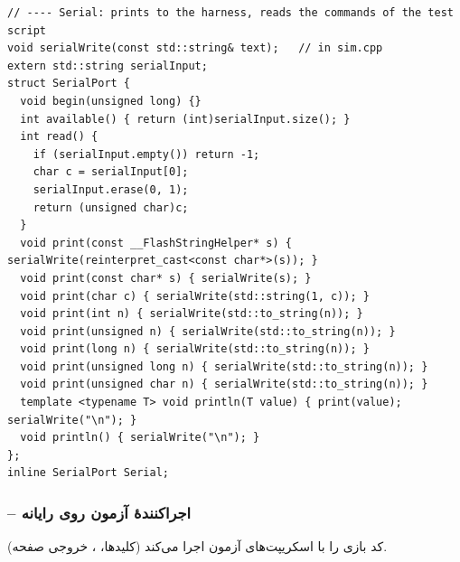 \documentclass[11pt,a4paper]{article}
\begin{document}
\begin{latin}
\begin{lstlisting}[language=Arduino]
// ---- Serial: prints to the harness, reads the commands of the test script
void serialWrite(const std::string& text);   // in sim.cpp
extern std::string serialInput;
struct SerialPort {
  void begin(unsigned long) {}
  int available() { return (int)serialInput.size(); }
  int read() {
    if (serialInput.empty()) return -1;
    char c = serialInput[0];
    serialInput.erase(0, 1);
    return (unsigned char)c;
  }
  void print(const __FlashStringHelper* s) { serialWrite(reinterpret_cast<const char*>(s)); }
  void print(const char* s) { serialWrite(s); }
  void print(char c) { serialWrite(std::string(1, c)); }
  void print(int n) { serialWrite(std::to_string(n)); }
  void print(unsigned n) { serialWrite(std::to_string(n)); }
  void print(long n) { serialWrite(std::to_string(n)); }
  void print(unsigned long n) { serialWrite(std::to_string(n)); }
  void print(unsigned char n) { serialWrite(std::to_string(n)); }
  template <typename T> void println(T value) { print(value); serialWrite("\n"); }
  void println() { serialWrite("\n"); }
};
inline SerialPort Serial;
\end{lstlisting}

\end{latin}

\subsubsection*{ – اجراکنندهٔ آزمون روی رایانه}
کد بازی را با اسکریپت‌های آزمون اجرا می‌کند (کلیدها، ، خروجی صفحه).
\end{document}

